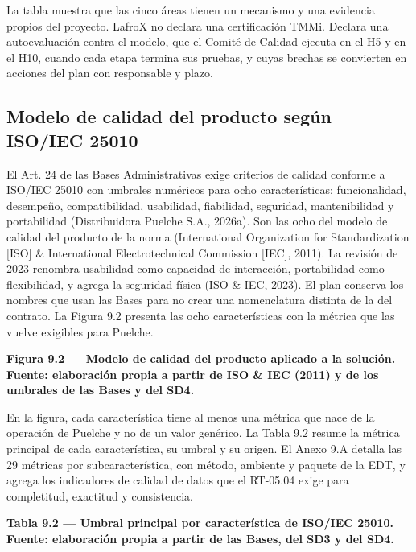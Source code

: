 La tabla muestra que las cinco áreas tienen un mecanismo y una evidencia propios del proyecto. LafroX no declara una certificación TMMi. Declara una autoevaluación contra el modelo, que el Comité de Calidad ejecuta en el H5 y en el H10, cuando cada etapa termina sus pruebas, y cuyas brechas se convierten en acciones del plan con responsable y plazo.

\subsection{Modelo de calidad del producto según ISO/IEC 25010}

El Art. 24 de las Bases Administrativas exige criterios de calidad conforme a ISO/IEC 25010 con umbrales numéricos para ocho características: funcionalidad, desempeño, compatibilidad, usabilidad, fiabilidad, seguridad, mantenibilidad y portabilidad (Distribuidora Puelche S.A., 2026a). Son las ocho del modelo de calidad del producto de la norma (International Organization for Standardization [ISO] \& International Electrotechnical Commission [IEC], 2011). La revisión de 2023 renombra usabilidad como capacidad de interacción, portabilidad como flexibilidad, y agrega la seguridad física (ISO \& IEC, 2023). El plan conserva los nombres que usan las Bases para no crear una nomenclatura distinta de la del contrato. La Figura 9.2 presenta las ocho características con la métrica que las vuelve exigibles para Puelche.



\textbf{Figura 9.2 — Modelo de calidad del producto aplicado a la solución. Fuente: elaboración propia a partir de ISO \& IEC (2011) y de los umbrales de las Bases y del SD4.}

En la figura, cada característica tiene al menos una métrica que nace de la operación de Puelche y no de un valor genérico. La Tabla 9.2 resume la métrica principal de cada característica, su umbral y su origen. El Anexo 9.A detalla las 29 métricas por subcaracterística, con método, ambiente y paquete de la EDT, y agrega los indicadores de calidad de datos que el RT-05.04 exige para completitud, exactitud y consistencia.

\textbf{Tabla 9.2 — Umbral principal por característica de ISO/IEC 25010. Fuente: elaboración propia a partir de las Bases, del SD3 y del SD4.}

